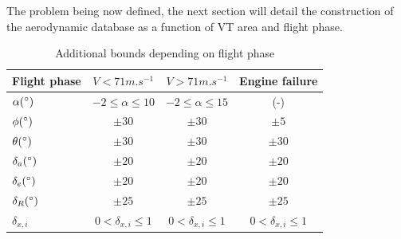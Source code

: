 The problem being now defined, the next section will detail the construction of the aerodynamic database as a function of VT area and flight phase.

\begin{table}[hbt!]
	\caption{\label{tab:Bonds} Additional bounds depending on flight phase}
	\centering
	\begin{tabular}{l|c|c|c}
		Flight phase & $V<71 m.s^{-1}$& $V>71 m.s^{-1}$ & Engine failure\\
		\hline
		$\alpha (\degree)$ & $-2\leq\alpha\leq 10$ & $-2\leq\alpha\leq 15$ & (-) \\
		$\phi (\degree)$ & $\pm 30$ & $\pm 30$ & $\pm 5$\\ 
		$\theta (\degree)$ & $\pm 30$ & $\pm 30$& $\pm 30$\\
		$\delta_a(\degree)$ & $\pm 20$& $\pm 20$& $\pm 20$\\
		$\delta_e(\degree)$ & $\pm 20$ & $\pm 20$ & $\pm 20$\\
		$\delta_R(\degree)$ & $\pm 25$ & $\pm 25$ & $\pm 25$\\
		$\delta_{x,i}$ & $0< \delta_{x,i} \leq 1$ & $0< \delta_{x,i} \leq 1$ & $0< \delta_{x,i} \leq 1$ \\
	\end{tabular}
\end{table}

